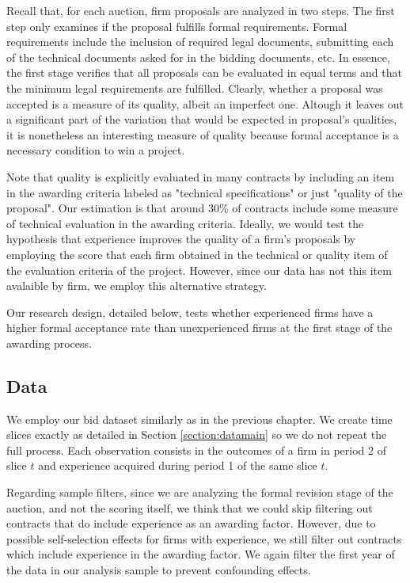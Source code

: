Recall that, for each auction, firm proposals are analyzed in two steps. The first step only examines if the proposal fulfills formal requirements. Formal requirements include the inclusion of required legal documents, submitting each of the technical documents asked for in the bidding documents, etc. In essence, the first stage verifies that all proposals can be evaluated in equal terms and that the minimum legal requirements are fulfilled. Clearly, whether a proposal was accepted is a measure of its quality, albeit an imperfect one. Altough it leaves out a significant part of the variation that would be expected in proposal's qualities, it is nonetheless an interesting measure of quality because formal acceptance is a necessary condition to win a project.

Note that quality is explicitly evaluated in many contracts by including an item in the awarding criteria labeled as "technical specifications" or just "quality of the proposal". Our estimation is that around 30\% of contracts include some measure of technical evaluation in the awarding criteria.  Ideally, we would test the hypothesis that experience improves the quality of a firm's proposals by employing the score that each firm obtained in the technical or quality item of the evaluation criteria of the project. However, since our data has not this item avalaible by firm, we employ this alternative strategy.

Our research design, detailed below, tests whether experienced firms have a higher formal acceptance rate than unexperienced firms at the first stage of the awarding process.

\subsection{Data}
We employ our bid dataset similarly as in the previous chapter. We create time slices exactly as detailed in Section \ref{section:datamain} so we do not repeat the full process.  Each observation consists in the outcomes of a firm in period 2 of slice $t$ and experience acquired during period 1 of the same slice $t$.

Regarding sample filters, since we are analyzing the formal revision stage of the auction, and not the scoring itself, we think that we could skip  filtering out contracts that do include experience as an awarding factor. However, due to possible self-selection effects for firms with experience, we still filter out contracts which include experience in the awarding factor. We again filter the first year of the data in our analysis sample to prevent confounding effects.

